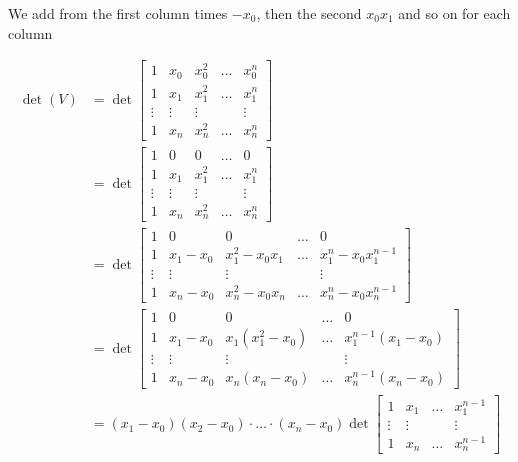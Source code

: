 We add from the first column times \(-x_0\), then the second \(x_0 x_1\) and so on for each column

\begin{align*}
    \det(V) &= \det
    \begin{bmatrix}
        1 & x_0 & x_0^2 & \dots & x_0^n \\ 
        1 & x_1 & x_1^2 & \dots & x_1^n \\ 
        \vdots &  \vdots & \vdots&  & \vdots \\ 
        1 & x_n & x_n^2 & \dots & x_n^n
    \end{bmatrix} \\ 
    &= 
    \det
    \begin{bmatrix}
        1 & 0 & 0 & \dots & 0 \\ 
        1 & x_1 & x_1^2 & \dots & x_1^n \\ 
        \vdots &  \vdots & \vdots&  & \vdots \\ 
        1 & x_n & x_n^2 & \dots & x_n^n
    \end{bmatrix} \\ 
    &= 
    \det
    \begin{bmatrix}
        1 & 0 & 0 & \dots & 0 \\ 
        1 & x_1 - x_0 & x_1^2 -x_0 x_1 & \dots & x_1^n  - x_0x_1^{n - 1}\\ 
        \vdots &  \vdots & \vdots&  & \vdots \\ 
        1 & x_n - x_0 & x_n^2 -x_0 x_n & \dots & x_n^n - x_0 x_n^{n - 1}
    \end{bmatrix} \\ 
    &= 
    \det
    \begin{bmatrix}
        1 & 0 & 0 & \dots & 0 \\ 
        1 & x_1 - x_0 & x_1(x_1^2 -x_0) & \dots & x_1^{n - 1}( x_1 - x_0)\\ 
        \vdots &  \vdots & \vdots&  & \vdots \\ 
        1 & x_n - x_0 &x_n (x_n - x_0) & \dots & x_n^{n - 1}(x_n - x_0)
    \end{bmatrix} \\ 
    &= (x_1 - x_0)(x_2 - x_0) \cdot \dots \cdot (x_n - x_0) \det
    \begin{bmatrix}
        1 & x_1 & \dots & x_1^{n - 1} \\ 
        \vdots & \vdots &  & \vdots \\ 
        1 & x_n & \dots & x_n^{n - 1} 
    \end{bmatrix}
\end{align*}

